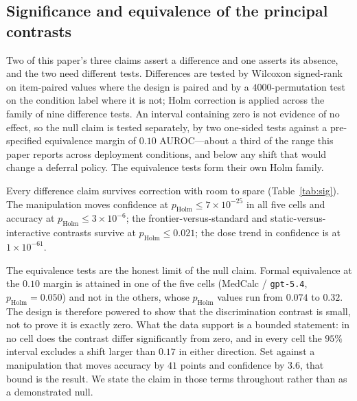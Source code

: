 \documentclass[journal,twoside]{IEEEtran}
\begin{document}
\subsection{Significance and equivalence of the principal contrasts}
Two of this paper's three claims assert a difference and one asserts its absence, and the two need
different tests. Differences are tested by Wilcoxon signed-rank on item-paired values where the
design is paired and by a $4000$-permutation test on the condition label where it is not; Holm
correction is applied across the family of nine difference tests. An interval containing zero is not
evidence of no effect, so the null claim is tested separately, by two one-sided tests against a
pre-specified equivalence margin of $0.10$ AUROC---about a third of the range this paper reports
across deployment conditions, and below any shift that would change a deferral policy. The
equivalence tests form their own Holm family.

Every difference claim survives correction with room to spare (Table~\ref{tab:sig}). The manipulation
moves confidence at $p_{\mathrm{Holm}} \le 7\times10^{-25}$ in all five cells and accuracy at
$p_{\mathrm{Holm}} \le 3\times10^{-6}$; the frontier-versus-standard and static-versus-interactive
contrasts survive at $p_{\mathrm{Holm}} \le 0.021$; the dose trend in confidence is at
$1\times10^{-61}$.

The equivalence tests are the honest limit of the null claim. Formal equivalence at the $0.10$ margin
is attained in one of the five cells (MedCalc / \texttt{gpt-5.4}, $p_{\mathrm{Holm}}=0.050$) and not
in the others, whose $p_{\mathrm{Holm}}$ values run from $0.074$ to $0.32$. The design is therefore
powered to show that the discrimination contrast is small, not to prove it is exactly zero. What the
data support is a bounded statement: in no cell does the contrast differ significantly from zero, and
in every cell the $95\%$ interval excludes a shift larger than $0.17$ in either direction. Set against
a manipulation that moves accuracy by $41$ points and confidence by $3.6$, that bound is the result.
We state the claim in those terms throughout rather than as a demonstrated null.
\end{document}
